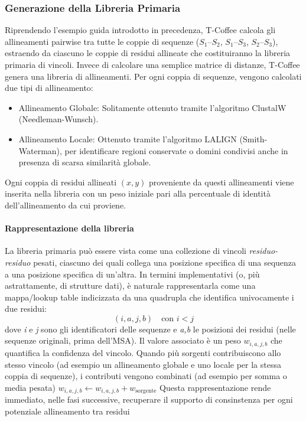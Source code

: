 \subsubsection{Generazione della Libreria Primaria}
Riprendendo l’esempio guida introdotto in precedenza, T-Coffee calcola
gli allineamenti pairwise tra tutte le coppie di sequenze ($S_1$--$S_2$,
$S_1$--$S_3$, $S_2$--$S_3$), estraendo da ciascuno le coppie di residui
allineate che costituiranno la libreria primaria di vincoli.
Invece di calcolare una semplice matrice di distanze, T-Coffee genera una libreria di allineamenti. Per ogni coppia di sequenze, vengono calcolati due tipi di allineamento:
\begin{itemize}
    \item Allineamento Globale: Solitamente ottenuto tramite l'algoritmo ClustalW (Needleman-Wunsch).
    \item Allineamento Locale: Ottenuto tramite l'algoritmo LALIGN (Smith-Waterman), per identificare regioni conservate o domini condivisi anche in presenza di scarsa similarità globale.
\end{itemize}
Ogni coppia di residui allineati $(x, y)$ proveniente da questi allineamenti viene inserita nella libreria con un peso iniziale pari alla percentuale di identità dell'allineamento da cui proviene.
\paragraph{Rappresentazione della libreria}
La libreria primaria può essere vista come una collezione di vincoli \textsl{residuo-residuo}
pesati, ciascuno dei quali collega una posizione specifica di una sequenza a 
una posizione specifica di un'altra. In termini implementativi (o, più astrattamente, di strutture dati), 
è naturale rappresentarla come una mappa/lookup table indicizzata da una quadrupla che 
identifica univocamente i due residui:
\[
(i,a,j,b)\quad \text{con } i<j
\]
dove \textsl{i} e \textsl{j} sono gli identificatori delle sequenze e \textsl{a,b}
le posizioni dei residui (nelle sequenze originali, prima dell'MSA). Il valore 
associato è un peso $w_{i,a,j,b}$ che quantifica la confidenza del vincolo. 
Quando più sorgenti contribuiscono allo stesso vincolo (ad esempio un allineamento globale e uno locale per la stessa coppia di sequenze),
i contributi vengono combinati (ad esempio per somma o media pesata)
$w_{i,a,j,b} \leftarrow w_{i,a,j,b} + w_{\text{sorgente}}$
Questa rappresentazione rende immediato, nelle fasi successive, recuperare il 
supporto di consinstenza per ogni potenziale allineamento tra residui

